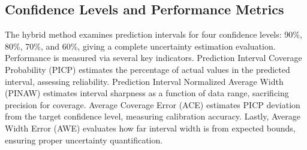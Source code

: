 \subsection{Confidence Levels and Performance Metrics}
The hybrid method examines prediction intervals for four confidence levels: 90\%, 80\%, 70\%, and 60\%, giving a complete uncertainty estimation evaluation. Performance is measured via several key indicators. Prediction Interval Coverage Probability (PICP) estimates the percentage of actual values in the predicted interval, assessing reliability. Prediction Interval Normalized Average Width (PINAW) estimates interval sharpness as a function of data range, sacrificing precision for coverage. Average Coverage Error (ACE) estimates PICP deviation from the target confidence level, measuring calibration accuracy. Lastly, Average Width Error (AWE) evaluates how far interval width is from expected bounds, ensuring proper uncertainty quantification.

